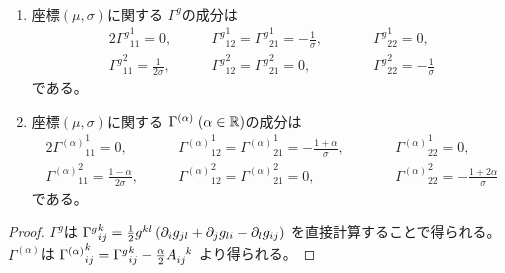 \documentclass[report]{jlreq}
\begin{document}
\begin{proposition}[接続係数]
    ~
    \begin{enumerate}
        \item 座標$(\mu, \sigma)$に関する
            $\Gamma^g$の成分は
            \begin{alignat}{2}
                {\Gamma^{g}}_{11}^1
                    = 0,
                    &\qquad
                        {\Gamma^{g}}_{12}^1
                            = {\Gamma^{g}}_{21}^1
                            = -\frac{1}{\sigma},
                    &&\qquad
                        {\Gamma^{g}}_{22}^1
                            = 0,
                    \\
                {\Gamma^{g}}_{11}^2
                    = \frac{1}{2\sigma},
                    &\qquad
                        {\Gamma^{g}}_{12}^2
                            = {\Gamma^{g}}_{21}^2
                            = 0,
                    &&\qquad
                        {\Gamma^{g}}_{22}^2
                            = -\frac{1}{\sigma}
            \end{alignat}
            である。
        \item 座標$(\mu, \sigma)$に関する
            $\Gamma^{(\alpha)} \; (\alpha \in \mathbb{R})$の成分は
            \begin{alignat}{2}
                {\Gamma^{(\alpha)}}_{11}^1
                    = 0,
                    &\qquad
                        {\Gamma^{(\alpha)}}_{12}^1
                            = {\Gamma^{(\alpha)}}_{21}^1
                            = - \frac{1 + \alpha}{\sigma},
                    &&\qquad
                        {\Gamma^{(\alpha)}}_{22}^1
                            = 0,
                    \\
                {\Gamma^{(\alpha)}}_{11}^2
                    = \frac{1 - \alpha}{2 \sigma},
                    &\qquad
                        {\Gamma^{(\alpha)}}_{12}^2
                            = {\Gamma^{(\alpha)}}_{21}^2
                            = 0,
                    &&\qquad
                        {\Gamma^{(\alpha)}}_{22}^2
                            = - \frac{1 + 2\alpha}{\sigma}
            \end{alignat}
            である。
    \end{enumerate}
\end{proposition}

\begin{proof}
    $\Gamma^g$は
    ${\Gamma^g}_{ij}^k
        = \frac{1}{2} g^{kl} \left({
            \partial_i g_{jl}
            + \partial_j g_{li}
            - \partial_l g_{ij}
        }\right)$
    を直接計算することで得られる。
    $\Gamma^{(\alpha)}$は
    ${\Gamma^{(\alpha)}}_{ij}^k
        = {\Gamma^g}_{ij}^k - \frac{\alpha}{2} A_{ij}^{\hphantom{ij}k}$
    より得られる。
\end{proof}
\end{document}
